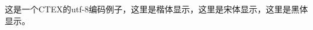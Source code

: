 \documentclass[UTF8]{ctexart}
\begin{document}
这是一个CTEX的utf-8编码例子，{\kaishu 这里是楷体显示}，{\songti 这里是宋体显示}，{\heiti 这里是黑体显示}。
\end{document}
